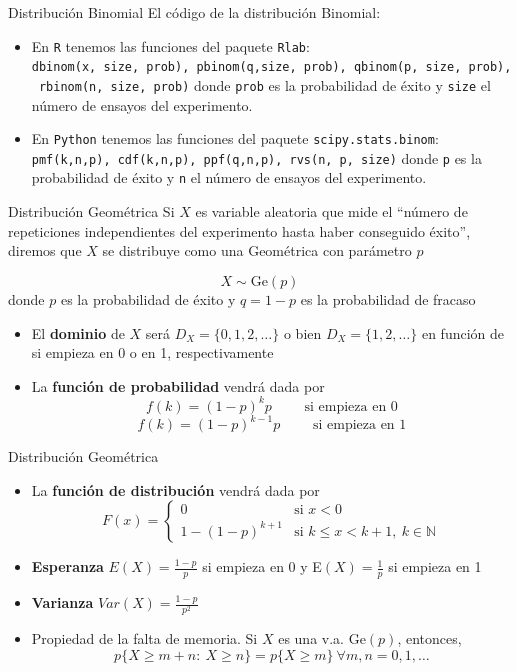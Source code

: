 \documentclass[
  ignorenonframetext,
]{beamer}
\providecommand{\tightlist}{%
  \setlength{\itemsep}{0pt}\setlength{\parskip}{0pt}}
\begin{document}
\begin{frame}[fragile]{Distribución Binomial}
\protect\hypertarget{distribuciuxf3n-binomial-3}{}
El código de la distribución Binomial:

\begin{itemize}
\tightlist
\item
  En \texttt{R} tenemos las funciones del paquete \texttt{Rlab}:
  \texttt{dbinom(x,\ size,\ prob),\ pbinom(q,size,\ prob),\ qbinom(p,\ size,\ prob),\ rbinom(n,\ size,\ prob)}
  donde \texttt{prob} es la probabilidad de éxito y \texttt{size} el
  número de ensayos del experimento.
\item
  En \texttt{Python} tenemos las funciones del paquete
  \texttt{scipy.stats.binom}:
  \texttt{pmf(k,n,p),\ cdf(k,n,p),\ ppf(q,n,p),\ rvs(n,\ p,\ size)}
  donde \texttt{p} es la probabilidad de éxito y \texttt{n} el número de
  ensayos del experimento.
\end{itemize}
\end{frame}

\begin{frame}{Distribución Geométrica}
\protect\hypertarget{distribuciuxf3n-geomuxe9trica}{}
Si \(X\) es variable aleatoria que mide el ``número de repeticiones
independientes del experimento hasta haber conseguido éxito'', diremos
que \(X\) se distribuye como una Geométrica con parámetro \(p\)

\[X\sim \text{Ge}(p)\] donde \(p\) es la probabilidad de éxito y
\(q = 1-p\) es la probabilidad de fracaso

\begin{itemize}
\item
  El \textbf{dominio} de \(X\) será \(D_X= \{0,1,2,\dots\}\) o bien
  \(D_X = \{1,2,\dots\}\) en función de si empieza en 0 o en 1,
  respectivamente
\item
  La \textbf{función de probabilidad} vendrá dada por
  \[f(k) = (1-p)^{k}p \qquad\text{ si empieza en 0}\]
  \[f(k) = (1-p)^{k-1}p \qquad\text{ si empieza en 1}\]
\end{itemize}
\end{frame}

\begin{frame}{Distribución Geométrica}
\protect\hypertarget{distribuciuxf3n-geomuxe9trica-1}{}
\begin{itemize}
\tightlist
\item
  La \textbf{función de distribución} vendrá dada por \[F(x) = \left\{
  \begin{array}{cl}
     0 & \text{si } x<0 
  \\ 1-(1-p)^{k+1} & \text{si } k\le x<k+1,\ k\in\mathbb{N}
  \end{array}
  \right.\]
\item
  \textbf{Esperanza} \(E(X) = \frac{1-p}{p}\) si empieza en 0 y
  E\((X) = \frac{1}{p}\) si empieza en 1
\item
  \textbf{Varianza} \(Var(X) = \frac{1-p}{p^2}\)
\item
  Propiedad de la falta de memoria. Si \(X\) es una v.a.
  \(\text{Ge}(p)\), entonces,
  \[p\{X\ge m+n:\ X\ge n\} = p\{X\ge m\}\ \forall m,n=0,1,\dots\]
\end{itemize}
\end{frame}
\end{document}
